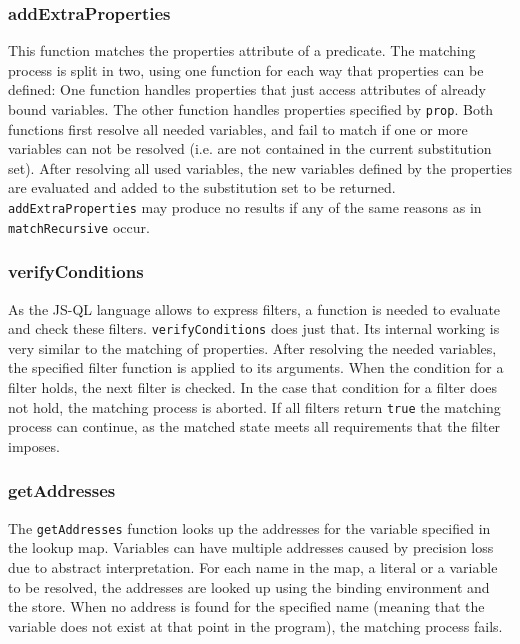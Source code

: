 \subsubsection{addExtraProperties}

This function matches the properties attribute of a predicate. The matching process is split in two, using one function for each way that properties can be defined: One function handles properties that just access attributes of already bound variables. The other function handles properties specified by \texttt{prop}. Both functions first resolve all needed variables, and fail to match if one or more variables can not be resolved (i.e. are not contained in the current substitution set). After resolving all used variables, the new variables defined by the properties are evaluated and added to the substitution set to be returned. \texttt{addExtraProperties} may produce no results if any of the same reasons as in \texttt{matchRecursive} occur.

\subsubsection{verifyConditions}

As the JS-QL language allows to express filters, a function is needed to evaluate and check these filters. \texttt{verifyConditions} does just that. Its internal working is very similar to the matching of properties. After resolving the needed variables, the specified filter function is applied to its arguments. When the condition for a filter holds, the next filter is checked. In the case that condition for a filter does not hold, the matching process is aborted. If all filters return \texttt{true} the matching process can continue, as the matched state meets all requirements that the filter imposes.

\subsubsection{getAddresses}
The \texttt{getAddresses} function looks up the addresses for the variable specified in the lookup map. Variables can have multiple addresses caused by precision loss due to abstract interpretation. For each name in the map, a literal or a variable to be resolved, the addresses are looked up using the binding environment and the store. When no address is found for the specified name (meaning that the variable does not exist at that point in the program), the matching process fails.

